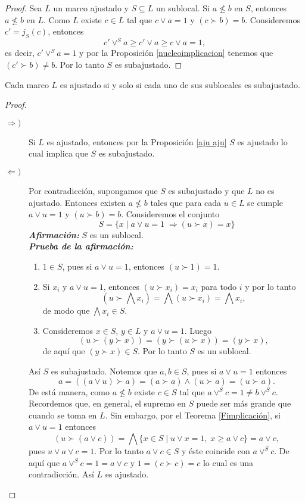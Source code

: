 \documentclass{comunicaciones}
\begin{document}
\begin{proof}
    Sea $L$ un marco ajustado y $S\subseteq L$ un sublocal. Si $a\nleq b$ en $S$, entonces $a\nleq b$ en $L$. Como $L$ existe $c\in L$ tal que $c\vee a=1$ y $(c\succ b)=b$. Consideremos $c'=j_S(c)$, entonces 
    \[
    c'\vee^S a\geq c'\vee a\geq c\vee a=1,
    \]es decir, $c'\vee^S a=1$ y por la Proposición \ref{nucleoimplicacion} tenemos que $(c'\succ b)\neq b$. Por lo tanto $S$ es subajustado.
\end{proof}

\begin{thm}\label{aju saju}
    Cada marco $L$ es ajustado si y solo si cada uno de sus sublocales es subajustado.
\end{thm}

\begin{proof}
    \begin{description}
        \item[$\Rightarrow )$] Si $L$ es ajustado, entonces por la Proposición \ref{aju aju} $S$ es ajustado lo cual implica que $S$ es subajustado. 
        \item[$\Leftarrow )$] Por contradicción, supongamos que $S$ es subajustado y que $L$ no es ajustado. Entonces existen $a\nleq b$ tales que para cada $u\in L$ se cumple $a\vee u=1$ y $(u\succ b)=b$. Consideremos el conjunto 
        \[
        S=\{x\mid a\vee u=1\; \Rightarrow (u\succ x)=x\}
        \]
        \emph{\textbf{Afirmación:}} $S$ es un sublocal.\\

        \noindent
        \emph{\textbf{Prueba de la afirmación:}} 
        \begin{enumerate}
            \item $1\in S$, pues si $a\vee u=1$, entonces $(u\succ 1)=1$.
            \item Si $x_i$ y $a\vee u=1$, entonces $(u\succ x_i)=x_i$ para todo $i$ y por lo tanto
            \[
            (u\succ \bigwedge x_i)=\bigwedge (u\succ x_i)=\bigwedge x_i,
            \]
            de modo que $\bigwedge x_i\in S$.
            \item Consideremos $x\in S$, $y\in L$ y $a\vee u=1$. Luego
            \[
            (u\succ (y\succ x))=(y\succ (u\succ x))=(y\succ x),
            \]
            de aquí que $(y\succ x)\in S$. Por lo tanto $S$ es un sublocal.
        \end{enumerate}
        Así $S$ es subajustado. Notemos que $a, b\in S$, pues si $a\vee u=1$ entonces 
        \[
        a=((a\vee u)\succ a)=(a\succ a)\wedge (u\succ a)=(u\succ a).
        \]
        De está manera, como $a\nleq b$ existe $c\in S$ tal que $a\vee^S c=1\neq b\vee^S c$. Recordemos que, en general, el supremo en $S$ puede ser más grande que cuando se toma en $L$. Sin embargo, por el Teorema \ref{Fimplicación}, si $a\vee u=1$ entonces
        \[
        (u\succ (a\vee c))=\bigwedge \{x\in S\mid u\vee x=1, \; x\geq a\vee c\}=a\vee c,
        \]
        pues $u\vee a\vee c=1$. Por lo tanto $a\vee c\in S$ y éste coincide con $a\vee^S c$. De aquí que $a\vee^Sc=1=a\vee c$ y $1=(c\succ c)=c$ lo cual es una contradicción. Así $L$ es ajustado.
    \end{description}
\end{proof}
\end{document}
